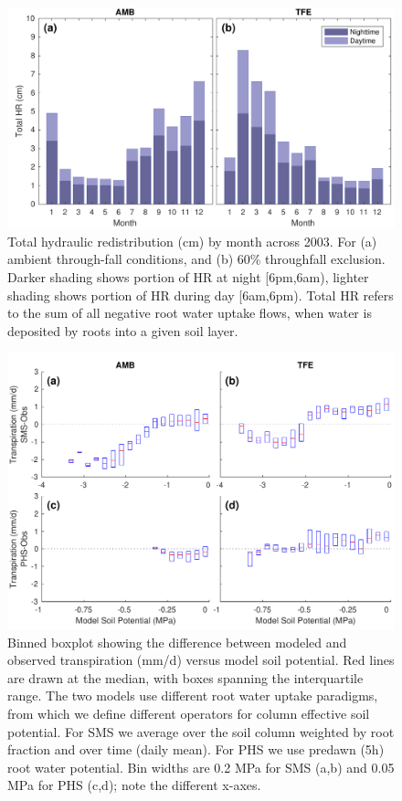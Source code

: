 \documentclass[draft,linenumbers]{agujournal}
\begin{document}
    \clearpage
    \begin{figure}[h]
     \centering
     \includegraphics[width=30pc]{../figs3/hr.pdf}
     \caption{Total hydraulic redistribution (cm) by month across 2003. For (a) ambient through-fall conditions, and (b) 60\% throughfall exclusion. 
     Darker shading shows portion of HR at night [6pm,6am), lighter shading shows portion of HR during day [6am,6pm).
     Total HR refers to the sum of all negative root water uptake flows, when water is deposited by roots into a given soil layer.}
     \label{fig:hr}
  \end{figure}
  

              \begin{figure}[h]
     \centering
     \includegraphics[width=30pc]{../figs3/sm3.pdf}
     \caption{Binned boxplot showing the difference between modeled and observed transpiration (mm/d) versus model soil potential.
     Red lines are drawn at the median, with boxes spanning the interquartile range.
     The two models use different root water uptake paradigms, from which we define different operators for column effective soil potential.
     For SMS we average over the soil column weighted by root fraction and over time (daily mean).
     For PHS we use predawn (5h) root water potential.
     Bin widths are 0.2 MPa for SMS (a,b) and 0.05 MPa for PHS (c,d); note the different x-axes. 
}
     \label{fig:cool}
  \end{figure}
          \clearpage
\end{document}
